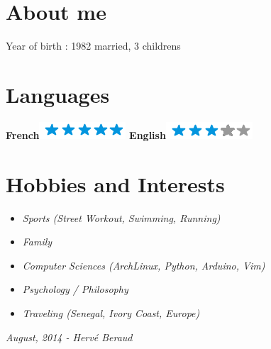 \documentclass[]{friggeri-cv}
\begin{document}
\begin{aside}
  \section{About me}
    Year of birth : 1982
    married, 3 childrens 
    ~
  \section{Languages}
    \textbf{French}\includegraphics[scale=0.40]{img/5stars.png}
    \textbf{English}\includegraphics[scale=0.40]{img/3stars.png}
\end{aside}

\section{Hobbies and Interests}
\begin {itemize}
    \item \emph {Sports (Street Workout, Swimming, Running)}
    \item \emph {Family}
    \item \emph {Computer Sciences (ArchLinux, Python, Arduino, Vim)}
    \item \emph {Psychology / Philosophy}
    \item \emph {Traveling (Senegal, Ivory Coast, Europe)}
\end {itemize}

\begin{flushleft}
\emph{}
\end{flushleft}
\begin{flushright}
\emph{August, 2014 - Hervé Beraud}
\end{flushright}
\end{document}
